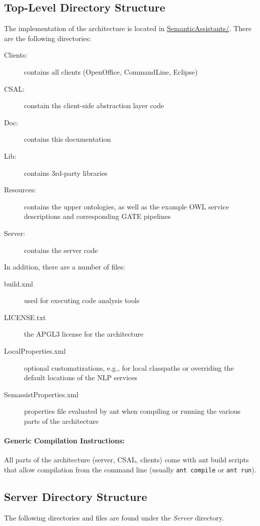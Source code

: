 \subsection{Top-Level Directory Structure}
The implementation of the architecture is located in
\url{SemanticAssistants/}. There are the following directories:
\begin{description}
\item[Clients:] contains all clients (OpenOffice, CommandLine, Eclipse)
\item[CSAL:] constain ths client-side abstraction layer code
\item[Doc:] contains this documentation
\item[Lib:] contains 3rd-party libraries
\item[Resources:] contains the upper ontologies, as well as the
  example OWL service descriptions and corresponding GATE pipelines
\item[Server:] contains the \sa server code
\end{description}
In addition, there are a number of files:
\begin{description}
\item[build.xml] used for executing code analysis tools
\item[LICENSE.txt] the APGL3 license for the \sa architecture
\item[LocalProperties.xml] optional customatizations, e.g., for local
  classpaths or overriding the default locations of the NLP services
\item[SemassistProperties.xml] properties file evaluated by ant when
  compiling or running the various parts of the \sa architecture
\end{description}

\paragraph{Generic Compilation Instructions:}
All parts of the \sa architecture (server, CSAL, clients) come with
ant build scripts that allow compilation from the command line
(usually \texttt{ant compile} or \texttt{ant run}).

\subsection{Server Directory Structure}
The following directories and files are found under the \emph{Server} directory.

